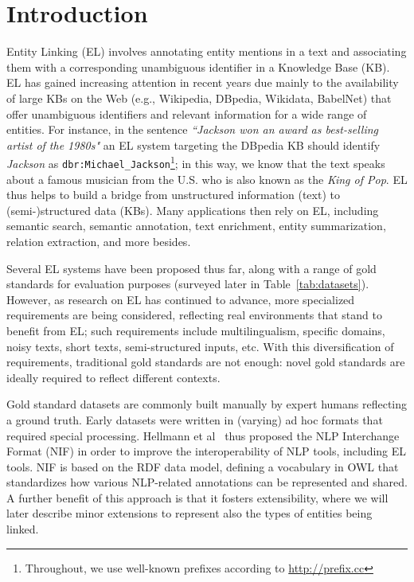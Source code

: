 \documentclass[sigconf]{acmart}
\begin{document}
\section{Introduction}
Entity Linking (EL) involves annotating entity mentions in a text and associating them with a corresponding unambiguous identifier in a Knowledge Base (KB). EL has gained increasing attention in recent years due mainly to the availability of large KBs on the Web (e.g., Wikipedia, DBpedia, Wikidata, BabelNet) that offer unambiguous identifiers and relevant information for a wide range of entities. For instance, in the sentence \textit{``Jackson won an award as best-selling artist of the 1980s"} an EL system targeting the DBpedia KB should identify \textit{Jackson} as \texttt{dbr:Michael\_Jackson}\footnote{Throughout, we use well-known prefixes according to \url{http://prefix.cc}}; in this way, we know that the text speaks about a famous musician from the U.S. who is also known as the \textit{King of Pop}. EL thus helps to build a bridge from unstructured information (text) to (semi-)structured data (KBs).  Many applications then rely on EL, including semantic search, semantic annotation, text enrichment, entity summarization, relation extraction, and more besides.

Several EL systems have been proposed thus far, along with a range of gold standards for evaluation purposes (surveyed later in Table~\ref{tab:datasets}). However, as research on EL has continued to advance, more specialized requirements are being considered, reflecting real environments that stand to benefit from EL; such requirements include multilingualism, specific domains, noisy texts, short texts, semi-structured inputs, etc. %
With this diversification of requirements, traditional gold standards are not enough: novel gold standards are ideally required to reflect different contexts.

Gold standard datasets are commonly built manually by expert humans reflecting a ground truth. Early datasets were written in (varying) ad hoc formats that required special processing. Hellmann et al~\cite{NIFpaper} thus proposed the NLP Interchange Format (NIF) in order to improve the interoperability of NLP tools, including EL tools. NIF is based on the RDF data model, defining a vocabulary in OWL that standardizes how various NLP-related annotations can be represented and shared. A further benefit of this approach is that it fosters extensibility, where we will later describe minor extensions to represent also the types of entities being linked. %
\end{document}
